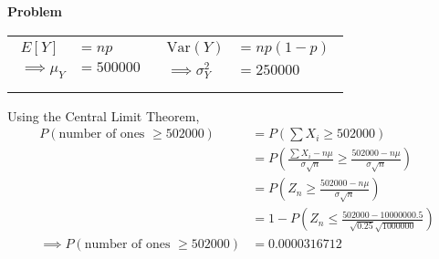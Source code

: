 \documentclass[12pt]{article}
\newenvironment{Ex}{\textbf{Problem}\vspace{.75em}\\}{}
\begin{document}
\begin{enumerate}
\begin{Ex}
\begin{solution}
      \begin{table}[H]
        \centering
        \begin{tabularx}{\linewidth}{XX}
          \begin{equation}
            \label{eq:1-y-mean}
            \begin{aligned}
              E[Y] &= np \\
              \implies \mu_Y &= 500000 \\
            \end{aligned}
          \end{equation}
          &
          \begin{equation}
            \label{eq:1-y-var}
            \begin{aligned}
              \text{Var}(Y) &= np(1-p) \\
              \implies \sigma_Y^2 &= 250000 \\
            \end{aligned}
          \end{equation}
        \end{tabularx}
      \end{table}
      Using the Central Limit Theorem,
      \begin{equation}
        \label{eq:1-sol}
        \begin{aligned}
          P(\text{number of ones } \ge 502000)
          &= P\left(\sum X_i \ge 502000\right) \\
          &= P\left(\frac{\sum X_i - n\mu}{\sigma\sqrt{n}} \ge
            \frac{502000-n\mu}{\sigma\sqrt{n}}\right) \\
          &= P\left(Z_n\ge\frac{502000-n\mu}{\sigma\sqrt{n}}\right) \\
          &= 1 - P\left(Z_n\le \frac{502000-1000000 0.5}
            {\sqrt{0.25}\sqrt{1000000}}\right) \\
          \implies P(\text{number of ones } \ge 502000) &= 0.0000316712
        \end{aligned}
      \end{equation}
    \end{solution}
  \end{Ex}


\end{enumerate}
\end{document}
